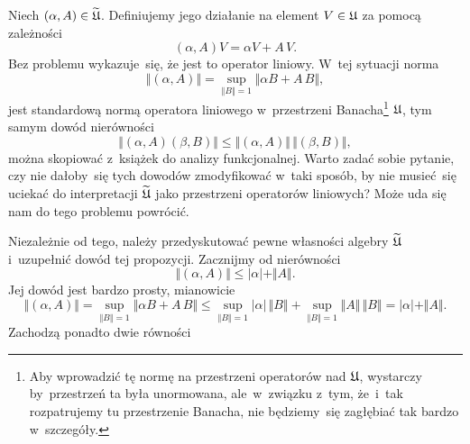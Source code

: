 \documentclass[a4paper,11pt]{article}
\begin{document}
Niech $( \alpha, A ) \in \widetilde{\mathfrak{U}}$. Definiujemy jego działanie na element
$V \in \mathfrak{U}$ za pomocą zależności
\begin{equation}
  \label{eq:Bratteli-Robinson-Operator-Algebras-ETC-Vol-I-s01-02}
  ( \alpha, A ) V = \alpha V + A \, V.
\end{equation}
Bez problemu wykazuje~się, że jest to operator liniowy. W~tej sytuacji
norma
\begin{equation}
  \label{eq:Bratteli-Robinson-Operator-Algebras-ETC-Vol-I-s01-03}
  \Vert ( \alpha, A ) \Vert =
  \sup_{ \Vert B \Vert = 1 } \Vert \alpha B + A \, B \Vert,
\end{equation}
jest standardową normą operatora liniowego w~przestrzeni
Banacha\footnote{Aby wprowadzić tę normę na przestrzeni operatorów nad
  $\mathfrak{U}$, wystarczy by~przestrzeń ta była unormowana, ale~w~związku
  z~tym, że~i~tak rozpatrujemy tu przestrzenie Banacha, nie będziemy~się
  zagłębiać tak bardzo w~szczegóły.}
$\mathfrak{U}$, tym samym dowód nierówności
\begin{equation}
  \label{eq:Bratteli-Robinson-Operator-Algebras-ETC-Vol-I-s01-04}
  \Vert ( \alpha, A ) ( \beta, B ) \Vert \leq
  \Vert ( \alpha, A ) \Vert \, \Vert ( \beta, B ) \Vert,
\end{equation}
można skopiować z~książek do analizy funkcjonalnej. Warto zadać sobie
pytanie, czy nie dałoby~się tych dowodów zmodyfikować w~taki sposób, by nie
musieć~się uciekać do interpretacji $\widetilde{\mathfrak{U}}$ jako przestrzeni
operatorów liniowych? Może uda się nam do tego problemu powrócić.

Niezależnie od tego, należy przedyskutować pewne własności algebry
$\widetilde{\mathfrak{U}}$ i~uzupełnić dowód tej propozycji. Zacznijmy od nierówności
\begin{equation}
  \label{eq:Bratteli-Robinson-Operator-Algebras-ETC-Vol-I-s01-05}
  \Vert ( \alpha, A ) \Vert \leq | \alpha | + \Vert A \Vert.
\end{equation}
Jej dowód jest bardzo prosty, mianowicie
\begin{equation}
  \label{eq:Bratteli-Robinson-Operator-Algebras-ETC-Vol-I-s01-06}
  \Vert ( \alpha, A ) \Vert =
  \sup_{ \Vert B \Vert = 1 } \Vert \alpha B + A \, B \Vert \leq
  \sup_{ \Vert B \Vert = 1 } | \alpha | \, \Vert B \Vert +
  \sup_{ \Vert B \Vert = 1 } \Vert A \Vert \, \Vert B \Vert =
  | \alpha | + \Vert A \Vert.
\end{equation}
Zachodzą ponadto dwie równości

\vspace{\negVerSpaceFour}
\end{document}
